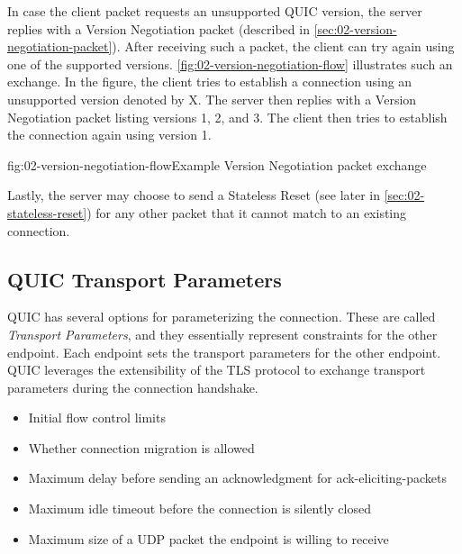In case the client packet requests an unsupported QUIC version, the server replies with a Version
Negotiation packet (described in \autoref{sec:02-version-negotiation-packet}). After receiving such
a packet, the client can try again using one of the supported versions.
\autoref{fig:02-version-negotiation-flow} illustrates such an exchange. In the figure, the client
tries to establish a connection using an unsupported version denoted by X. The server then replies
with a Version Negotiation packet listing versions 1, 2, and 3. The client then tries to establish
the connection again using version 1.

\begin{myFigure}{fig:02-version-negotiation-flow}{Example Version Negotiation packet exchange}

\resizebox{\linewidth}{!}{}

\end{myFigure}

Lastly, the server may choose to send a Stateless Reset (see later in
\autoref{sec:02-stateless-reset}) for any other packet that it cannot match to an existing
connection.

\subsection{QUIC Transport Parameters}\label{sec:02-transport-parameters}

QUIC has several options for parameterizing the connection. These are called \textit{Transport
Parameters}, and they essentially represent constraints for the other endpoint. Each endpoint sets
the transport parameters for the other endpoint. QUIC leverages the extensibility of the TLS
protocol to exchange transport parameters during the connection handshake.

\begin{itemize}

  \item Initial flow control limits

  \item Whether connection migration is allowed

  \item Maximum delay before sending an acknowledgment for \glspl{ack-eliciting-packet}

  \item Maximum idle timeout before the connection is silently closed

  \item Maximum size of a UDP packet the endpoint is willing to receive

\end{itemize}

